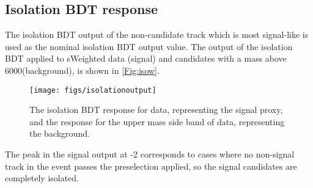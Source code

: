 \subsection{Isolation BDT response}
The isolation BDT output of the non-candidate track which is most signal-like is used as the nominal isolation BDT output value. The output of the isolation BDT applied to sWeighted \LbKjpsi data (signal) and \Lbpi candidates with a mass above 6000\mevcc (background), is shown in \autoref{Fig:isow}.
\begin{figure}[ht!]
    \centering
  \texttt{[image: figs/isolationoutput]}
  \caption{The isolation BDT response for \LbKjpsi data, representing the signal proxy, and the response for the upper mass side band of \Lbpi data, representing the background.}
    \label{Fig:isow}
\end{figure}
The peak in the signal output at -2 corresponds to cases where no non-signal track in the event passes the preselection applied, so the signal candidates are completely isolated. %

